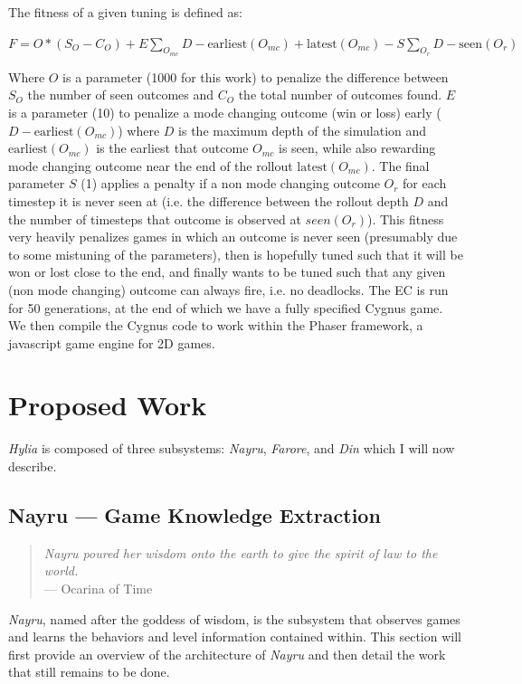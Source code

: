 \documentclass[a4paper]{article}
\begin{document}
The fitness of a given tuning is defined as:

$F = O*(S_O-C_O) + E\sum_{O_{mc}}D-\mathrm{earliest}(O_{mc})+\mathrm{latest}(O_{mc}) - S\sum_{O_r} D-\mathrm{seen}(O_r)  $

Where $O$ is a parameter (1000 for this work) to penalize the difference between $S_O$ the number of seen outcomes and $C_O$ the total number of outcomes found. $E$ is a parameter (10) to penalize a mode changing outcome (win or loss) early ($D-\mathrm{earliest}(O_{mc})$) where $D$ is the maximum depth of the simulation and $\mathrm{earliest}(O_{mc})$ is the earliest that outcome $O_{mc}$ is seen, while also rewarding mode changing outcome near the end of the rollout $\mathrm{latest}(O_{mc})$. The final parameter $S$ (1) applies a penalty if a non mode changing outcome $O_r$ for each timestep it is never seen at (i.e. the difference between the rollout depth $D$ and the number of timesteps that outcome is observed at $seen(O_r)$).  This fitness very heavily penalizes games in which an outcome is never seen (presumably due to some mistuning of the parameters), then is hopefully tuned such that it will be won or lost close to the end, and finally wants to be tuned such that any given (non mode changing) outcome can always fire, i.e. no deadlocks.  The EC is run for 50 generations, at the end of which we have a fully specified Cygnus game.   We then compile the Cygnus code to work within the Phaser \cite{phaser} framework, a javascript game engine for 2D games.  

\section{Proposed Work}

\textit{Hylia} is composed of three subsystems: \textit{Nayru}, \textit{Farore}, and \textit{Din} which I will now describe.

\subsection{Nayru --- Game Knowledge Extraction}
\begin{quotation}
\textit{Nayru poured her wisdom onto the earth to give the spirit of law to the world.} \\ \indent  \indent --- Ocarina of Time
\end{quotation}

\textit{Nayru}, named after the goddess of wisdom, is the subsystem that observes games and learns the behaviors and level information contained within.  This section will first provide an overview of the architecture of \textit{Nayru} and then detail the work that still remains to be done.
\end{document}

